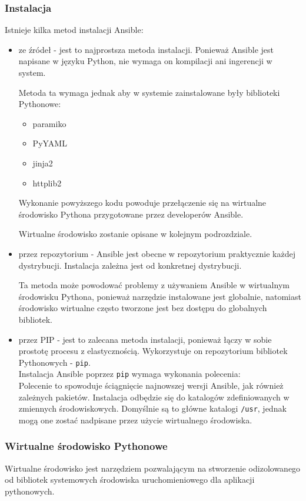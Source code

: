 \subsubsection{Instalacja}
Istnieje kilka metod instalacji Ansible:
\begin{itemize}
\item ze źródeł - jest to najprostsza metoda instalacji. Ponieważ Ansible jest napisane w języku Python, nie wymaga on kompilacji ani ingerencji w system.

Metoda ta wymaga jednak aby w systemie zainstalowane były biblioteki Pythonowe:
\begin{itemize}
\item paramiko
\item PyYAML
\item jinja2
\item httplib2
\end{itemize}
Wykonanie powyższego kodu powoduje przełączenie się na wirtualne środowisko Pythona przygotowane przez developerów Ansible.

Wirtualne środowisko zostanie opisane w kolejnym podrozdziale.
\item przez repozytorium - Ansible jest obecne w repozytorium praktycznie każdej dystrybucji. Instalacja zależna jest od konkretnej dystrybucji.

Ta metoda może powodować problemy z używaniem Ansible w wirtualnym środowisku Pythona, ponieważ narzędzie instalowane jest globalnie, natomiast środowisko wirtualne często tworzone jest bez dostępu do globalnych bibliotek.
\item przez PIP - jest to zalecana metoda instalacji, ponieważ łączy w sobie prostotę procesu z elastycznością.
Wykorzystuje on repozytorium bibliotek Pythonowych - \texttt{pip}.\\
Instalacja Ansible poprzez \texttt{pip} wymaga wykonania polecenia:\\

Polecenie to spowoduje ściągnięcie najnowszej wersji Ansible, jak również zależnych pakietów.
Instalacja odbędzie się do katalogów zdefiniowanych w zmiennych środowiskowych. Domyślnie są to główne katalogi \texttt{/usr}, jednak mogą one zostać nadpisane przez użycie wirtualnego środowiska.
\end{itemize}
\subsubsection{Wirtualne środowisko Pythonowe}
Wirtualne środowisko jest narzędziem pozwalającym na stworzenie odizolowanego od bibliotek systemowych środowiska uruchomieniowego dla aplikacji pythonowych.

